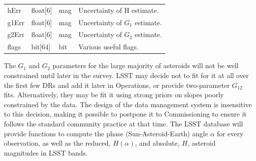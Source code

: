 \begin{center}
\begin{longtable}{p{3cm}p{2cm}p{2cm}p{5cm}}
hErr & float[6] & mag & Uncertainty of H estimate.\\

g1Err & float[6] & mag & Uncertainty of $G_1$ estimate. \\

g2Err & float[6] & mag & Uncertainty of $G_2$ estimate. \\

flags & bit[64] & bit & Various useful flags. \\ \hline

\end{longtable}
\end{center}

The $G_1$ and $G_2$ parameters for the large majority of asteroids will not be well constrained until later in the survey. LSST may decide not to fit for it at all over the first few DRs and add it later in Operations, or provide two-parameter $G_{12}$ fits. Alternatively, they may be fit it using strong priors on slopes poorly constrained by the data. The design of the data management system is insensitive to this decision, making it possible to postpone it to Commissioning to ensure it follows the standard community practice at that time.
The LSST database will provide functions to compute the phase (Sun-Asteroid-Earth) angle $\alpha$ for every observation, as well as the reduced, $H(\alpha)$, and absolute, $H$, asteroid magnitudes in LSST bands.
